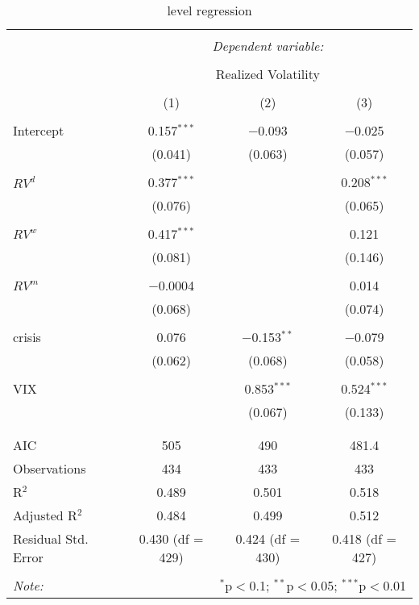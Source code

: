 
\begin{table}[!htbp] \centering 
  \caption{level regression} 
  \label{} 
\begin{tabular}{@{\extracolsep{5pt}}lccc} 
\\[-1.8ex]\hline 
\hline \\[-1.8ex] 
 & \multicolumn{3}{c}{\textit{Dependent variable:}} \\ 
\cline{2-4} 
\\[-1.8ex] & \multicolumn{3}{c}{Realized Volatility} \\ 
\\[-1.8ex] & (1) & (2) & (3)\\ 
\hline \\[-1.8ex] 
 Intercept & 0.157$^{***}$ & $-$0.093 & $-$0.025 \\ 
  & (0.041) & (0.063) & (0.057) \\ 
  & & & \\ 
 $RV^{d}$ & 0.377$^{***}$ &  & 0.208$^{***}$ \\ 
  & (0.076) &  & (0.065) \\ 
  & & & \\ 
 $RV^{w}$ & 0.417$^{***}$ &  & 0.121 \\ 
  & (0.081) &  & (0.146) \\ 
  & & & \\ 
 $RV^{m}$ & $-$0.0004 &  & 0.014 \\ 
  & (0.068) &  & (0.074) \\ 
  & & & \\ 
 crisis & 0.076 & $-$0.153$^{**}$ & $-$0.079 \\ 
  & (0.062) & (0.068) & (0.058) \\ 
  & & & \\ 
 VIX &  & 0.853$^{***}$ & 0.524$^{***}$ \\ 
  &  & (0.067) & (0.133) \\ 
  & & & \\ 
\hline \\[-1.8ex] 
AIC & 505 & 490 & 481.4 \\ 
Observations & 434 & 433 & 433 \\ 
R$^{2}$ & 0.489 & 0.501 & 0.518 \\ 
Adjusted R$^{2}$ & 0.484 & 0.499 & 0.512 \\ 
Residual Std. Error & 0.430 (df = 429) & 0.424 (df = 430) & 0.418 (df = 427) \\ 
\hline 
\hline \\[-1.8ex] 
\textit{Note:}  & \multicolumn{3}{r}{$^{*}$p$<$0.1; $^{**}$p$<$0.05; $^{***}$p$<$0.01} \\ 
\end{tabular} 
\end{table} 
